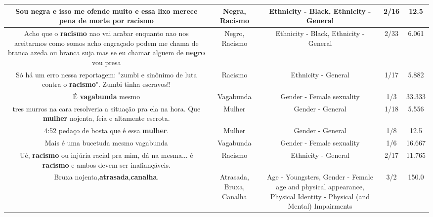 \documentclass[11pt]{article}
\newlength\mylength
\begin{document}
\begin{center}
\begin{longtable}{|C{.65\mylength}|C{.30\mylength}|C{.12\mylength}|C{.12\mylength}|C{.12\mylength}|}
  \small Sou \textbf{negra} e isso me ofende muito e essa lixo merece pena de morte por racismo\normalsize   & Negra, Racismo & Ethnicity - Black, Ethnicity - General & 2/16 & 12.5 \\  \hline
  \small Acho que o \textbf{racismo} nao vai acabar enquanto nao nos aceitarmos como somos acho engraçado podem me chama de branca azeda ou branca suja mas se eu chamar alguem de \textbf{negro} vou presa\normalsize   & Negro, Racismo & Ethnicity - Black, Ethnicity - General & 2/33 & 6.061 \\  \hline
  \small Só há um erro nessa reportagem: "zumbi e sinônimo de luta contra o \textbf{racismo}". Zumbi tinha  escravos!!\normalsize   & Racismo & Ethnicity - General & 1/17 & 5.882 \\  \hline
  \small É \textbf{vagabunda} mesmo\normalsize   & Vagabunda & Gender - Female sexuality & 1/3 & 33.333 \\  \hline
  \small tres murros na cara resolveria a situação pra ela na hora. Que \textbf{mulher} nojenta, feia e altamente escrota.\normalsize   & Mulher & Gender - General & 1/18 & 5.556 \\  \hline
  \small 4:52 pedaço de bosta que é essa \textbf{mulher}.\normalsize   & Mulher & Gender - General & 1/8 & 12.5 \\  \hline
  \small Mais é uma bucetuda mesmo vagabunda\normalsize   & Vagabunda & Gender - Female sexuality & 1/6 & 16.667 \\  \hline
  \small Ué, \textbf{racismo} ou injúria racial pra mim, dá na mesma... é \textbf{racismo} e ambos devem ser inafiançáveis.\normalsize   & Racismo & Ethnicity - General & 2/17 & 11.765 \\  \hline
  \small Bruxa nojenta,\textbf{atrasada},\textbf{canalha}.\normalsize   & Atrasada, Bruxa, Canalha & Age - Youngsters, Gender - Female age and physical appearance, Physical Identity - Physical (and Mental) Impairments & 3/2 & 150.0 \\  \hline

\end{longtable}
\end{center}
\end{document}

